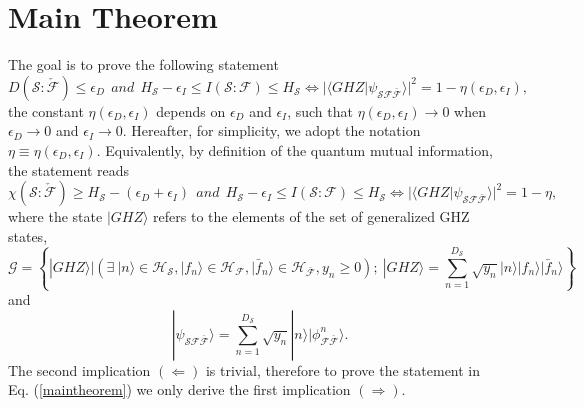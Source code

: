 \documentclass[a4paper,11pt,accepted=2024-09-14]{quantumarticle}
\newcommand\myeqref[1]{
	Eq. (\textup{\ref{#1}})
}
\newcommand{\+}         {\dagger}
\newcommand{\mc}[1]{\mathcal{#1}}
\begin{document}
\section{{Main Theorem}}
The goal is to prove the following statement
\begin{equation}
		D(\mc{S}:\check{\mc{F}}) \leq \epsilon_{D} \ \ \textit{and} \ \ H_{\mc{S}}-\epsilon_{I} \leq I(\mc{S}:\mc{F}) \leq H_{\mc{S}} \Leftrightarrow 
		|\langle GHZ|\psi_{\mc{SF}\bar{\mc{F}}}\rangle|^2 = 1-\eta(\epsilon_{D},\epsilon_{I}),
		\label{maintheorem}
\end{equation}
the constant $\eta(\epsilon_{D},\epsilon_{I})$ depends on $\epsilon_{D}$ and $\epsilon_{I}$, such that $\eta(\epsilon_{D},\epsilon_{I}) \rightarrow 0$ when $\epsilon_{D} \rightarrow 0$ and $\epsilon_{I} \rightarrow 0$. Hereafter, for simplicity, we adopt the notation $\eta \equiv \eta(\epsilon_{D},\epsilon_{I})$. Equivalently, by definition of the quantum mutual information, the statement reads
\begin{equation}
	\chi(\mc{S}:\check{\mc{F}}) \geq H_{\mc{S}}-(\epsilon_{D}+\epsilon_{I}) \ \ \textit{and} \ \ H_{\mc{S}}-\epsilon_{I} \leq I(\mc{S}:\mc{F}) \leq H_{\mc{S}} \Leftrightarrow 
	|\langle GHZ|\psi_{\mc{SF}\bar{\mc{F}}}\rangle|^2 = 1-\eta,
\end{equation}
where the state $|GHZ\rangle$ refers to the elements of the set of generalized GHZ states,
\begin{equation}
\mc{G}= \left\{ |GHZ\rangle \biggr\rvert \left(\exists \ |n\rangle \in \mc{H}_{\mc{S}}, |f_n\rangle \in \mc{H}_{\mc{F}}, |\bar{f}_n\rangle \in \mc{H}_{\bar{\mc{F}}}, y_n \geq 0\right); \ |GHZ\rangle=\sum^{D_{\mc{S}}}_{n=1} \sqrt{y_n} |n\rangle |f_{n}\rangle |\bar{f}_{n}\rangle \right\}
\label{setghz}
\end{equation}
and
\begin{equation}
	|\psi_{\mc{SF}\bar{\mc{F}}}\rangle = \sum^{D_{\mc{S}}}_{n=1} \sqrt{y_n}|n\rangle |\phi^{n}_{\mc{F}\bar{\mc{F}}}\rangle.
\label{univ_psi}
\end{equation}
The second implication $(\Leftarrow)$ is trivial, therefore to prove the statement in~\myeqref{maintheorem} we only derive the first implication $(\Rightarrow)$.
\end{document}

